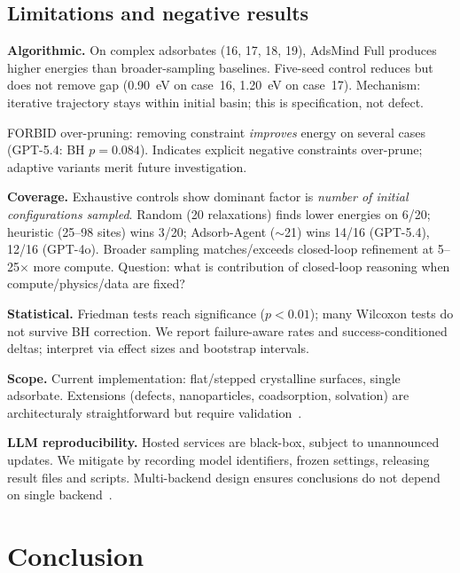 \subsection{Limitations and negative results}

\textbf{Algorithmic.} On complex adsorbates (16, 17, 18, 19), AdsMind Full produces higher energies than broader-sampling baselines.
Five-seed control reduces but does not remove gap (0.90~eV on case~16, 1.20~eV on case~17).
Mechanism: iterative trajectory stays within initial basin; this is specification, not defect.

FORBID over-pruning: removing constraint \textit{improves} energy on several cases (GPT-5.4: BH $p = 0.084$).
Indicates explicit negative constraints over-prune; adaptive variants merit future investigation.

\textbf{Coverage.} Exhaustive controls show dominant factor is \textit{number of initial configurations sampled}.
Random (20 relaxations) finds lower energies on 6/20; heuristic (25--98 sites) wins 3/20; Adsorb-Agent ($\sim$21) wins 14/16 (GPT-5.4), 12/16 (GPT-4o).
Broader sampling matches/exceeds closed-loop refinement at 5--25$\times$ more compute.
Question: what is contribution of closed-loop reasoning when compute/physics/data are fixed?

\textbf{Statistical.} Friedman tests reach significance ($p < 0.01$); many Wilcoxon tests do not survive BH correction.
We report failure-aware rates and success-conditioned deltas; interpret via effect sizes and bootstrap intervals.

\textbf{Scope.} Current implementation: flat/stepped crystalline surfaces, single adsorbate.
Extensions (defects, nanoparticles, coadsorption, solvation) are architecturaly straightforward but require validation~\cite{yang2026quasar,zhang2026towards}.

\textbf{LLM reproducibility.} Hosted services are black-box, subject to unannounced updates.
We mitigate by recording model identifiers, frozen settings, releasing result files and scripts.
Multi-backend design ensures conclusions do not depend on single backend~\cite{alfred2026data,huang2026towards}.


\section{Conclusion}

